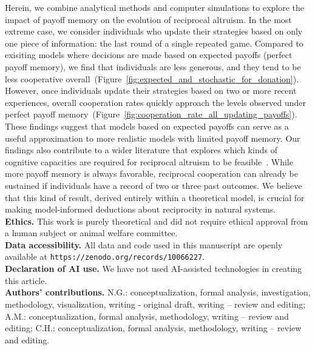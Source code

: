 \documentclass[11pt]{article}
\newcommand{\FigBaseResults}{Figure~\ref{fig:expected_and_stochastic_for_donation}}
\newcommand{\FigHigherMemory}{Figure~\ref{fig:cooperation_rate_all_updating_payoffs}}
\theoremstyle{plainCl1}
\theoremstyle{plainCl2}
\begin{document}
Herein, we combine analytical methods and computer simulations to explore the impact of payoff memory on the evolution of reciprocal altruism. 
In the most extreme case, we consider individuals who update their strategies based on only one piece of information:  the last round of a single repeated game. 
Compared to exisiting models where decisions are made based on expected payoffs (perfect payoff memory), we find that individuals are less generous, and they tend to be less cooperative overall~(\FigBaseResults). 
However, once individuals update their strategies based on two or more recent experiences, overall cooperation rates quickly approach the levels observed under perfect payoff memory~(\FigHigherMemory). 
These findings suggest that models based on expected payoffs can serve as a useful approximation to more realistic models with limited payoff memory. 
Our findings also contribute to a wider literature that explores which kinds of cognitive capacities are required for reciprocal altruism to be feasible~\citep[e.g.,][]{Stevens:fip:2011,Volstorf:PlosOne:2011}. 
While more payoff memory is always favorable, reciprocal cooperation can already be sustained if individuals have a record of two or three past outcomes. We believe that this kind of result, derived entirely within a theoretical model, is crucial for making model-informed deductions about reciprocity in natural systems.\\[0.5cm]


\noindent
{\bf Ethics.}
This work is purely theoretical and did not require ethical approval from a human subject or animal welfare committee.\\

\noindent
{\bf Data accessibility.}
All data and code used in this manuscript are openly available at\newline
\texttt{https://zenodo.org/records/10066227}.\\

\noindent
{\bf Declaration of AI use.}
We have not used AI-assisted technologies in creating this article.\\

\noindent
{\bf Authors' contributions.}
N.G.: conceptualization, formal analysis, investigation, methodology, visualization, writing - original draft, writing -- review and editing; 
A.M.: conceptualization, formal analysis, methodology, writing -- review and editing; 
C.H.: conceptualization, formal analysis, methodology, writing -- review and editing.\\
\end{document}

